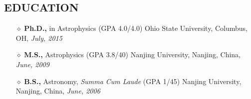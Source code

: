 \documentclass[10pt]{res}
\newcommand{\blockline}{\noindent\hspace{-0.03\textwidth}
{\rule{1.03\textwidth}{0.8pt}}}
\begin{document}
\begin{resume}
\section{\large EDUCATION}
\vspace{-0.2cm}
\noindent{\blockline}
\begin{itemize} [leftmargin=0.0cm]
 \item[$\diamond$]  {\bf Ph.D.,}  in Astrophysics (GPA 4.0/4.0) \hfill   Ohio State University, Columbus, OH, {\it July, 2015} 
 \item[$\diamond$]  {\bf M.S.,} Astrophysics (GPA 3.8/40) \hfill  Nanjing University, Nanjing, China, {\it June, 2009} 
 \item[$\diamond$]  {\bf B.S.,} Astronomy, {\it Summa Cum Laude} (GPA 1/45) \hfill Nanjing University, Nanjing, China,  {\it June, 2006}
 
  
\end{itemize} 


 



 


\end{resume}
\end{document}

